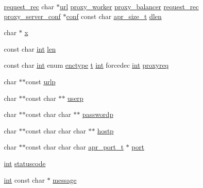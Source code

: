 \begin{DoxyCompactItemize}
\item 
\hyperlink{structrequest__rec}{request\+\_\+rec} char $\ast$\hyperlink{group__APR__Util__Escaping_gaec657bef26e5ff27b9442563a591d9ec}{url} \hyperlink{structproxy__worker}{proxy\+\_\+worker} \hyperlink{structproxy__balancer}{proxy\+\_\+balancer} \hyperlink{structrequest__rec}{request\+\_\+rec} \hyperlink{structproxy__server__conf}{proxy\+\_\+server\+\_\+conf} $\ast$\hyperlink{group__MOD__PROXY_ga4d7edd451c4bb8ed9ce9012e5dea2b14}{conf} const char \hyperlink{group__apr__platform_gaaa72b2253f6f3032cefea5712a27540e}{apr\+\_\+size\+\_\+t} \hyperlink{group__MOD__PROXY_ga63ef3f66045cd6e20f6ea5a82363580d}{dlen}
\item 
char $\ast$ \hyperlink{group__MOD__PROXY_gaa51afdb6d96b938b938dc9439be201be}{x}
\item 
const char \hyperlink{pcre_8txt_a42dfa4ff673c82d8efe7144098fbc198}{int} \hyperlink{group__MOD__PROXY_ga0ef2027e34e9460e00be18b803496433}{len}
\item 
const char \hyperlink{pcre_8txt_a42dfa4ff673c82d8efe7144098fbc198}{int} enum \hyperlink{group__MOD__PROXY_ga4484631c7debf2a3a8d82d27273eb629}{enctype} \hyperlink{pcretest_8txt_a9ffb27fb8e1f90c17b13303fee2fb883}{t} \hyperlink{pcre_8txt_a42dfa4ff673c82d8efe7144098fbc198}{int} forcedec \hyperlink{pcre_8txt_a42dfa4ff673c82d8efe7144098fbc198}{int} \hyperlink{group__MOD__PROXY_ga7adaa91224b884116382c7c9a5b86ff4}{proxyreq}
\item 
char $\ast$$\ast$const \hyperlink{group__MOD__PROXY_ga974d9b4d643e6776a5a12061b88b3ae3}{urlp}
\item 
char $\ast$$\ast$const char $\ast$$\ast$ \hyperlink{group__MOD__PROXY_gafab7f01dc92afd3e79a59fe3a2ea5932}{userp}
\item 
char $\ast$$\ast$const char char $\ast$$\ast$ \hyperlink{group__MOD__PROXY_ga93be1099b442eb117913f581e856e788}{passwordp}
\item 
char $\ast$$\ast$const char char char $\ast$$\ast$ \hyperlink{group__MOD__PROXY_ga85ac436260ffb27bcf16dae08faaebd4}{hostp}
\item 
char $\ast$$\ast$const char char char \hyperlink{group__apr__network__io_gaa670a71960f6eb4fe0d0de2a1e7aba03}{apr\+\_\+port\+\_\+t} $\ast$ \hyperlink{group__MOD__PROXY_ga51f76dbdc6c7ead3595f9c869a23d0bf}{port}
\item 
\hyperlink{pcre_8txt_a42dfa4ff673c82d8efe7144098fbc198}{int} \hyperlink{group__MOD__PROXY_ga5bace9ccde1bc807518a5076c01f0f85}{statuscode}
\item 
\hyperlink{pcre_8txt_a42dfa4ff673c82d8efe7144098fbc198}{int} const char $\ast$ \hyperlink{group__MOD__PROXY_ga0c50798f43a2b6a973e0faf3b4038d54}{message}

\end{DoxyCompactItemize}
